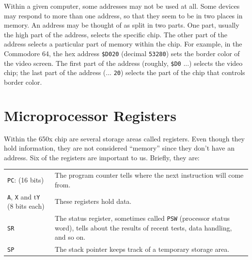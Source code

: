 \documentclass[11pt,a4paper,titlepage]{memoir}
\begin{document}
Within a given computer, some addresses may not be used at all. Some
devices may respond to more than one address, so that they seem to be
in two places in memory.
An address may be thought of as split in two parts. One part, usually the
high part of the address, selects the specific chip. The other part of the
address selects a particular part of memory within the chip. For example,
in the Commodore 64, the hex address \texttt{\$D020} (decimal \texttt{53280}) sets
the border color of the video screen. The first part of the address (roughly,
\texttt{\$D0} ...) selects the video chip; the last part of the address (... \texttt{20})
selects the part of the chip that controls border color.

\section{Microprocessor Registers}
Within the 650x chip are several storage areas called registers. Even
though they hold information, they are not considered ``memory'' since
they don't have an address. Six of the registers are important to us. Briefly,
they are:\\

\begin{tabulary}{1.0\textwidth}{lL}
	\texttt{PC}: (16 bits) & The program counter tells where the next
	instruction will come from.\\
	\texttt{A}, \texttt{X} and t\texttt{Y} (8 bits each) &  These registers hold data.\\
	\texttt{SR} & The status register, sometimes called \texttt{PSW} (processor status word), tells about the results of recent tests, data handling, and so on.\\
	\texttt{SP} &  The stack pointer keeps track of a temporary
	storage area.\\
\end{tabulary}\\
\end{document}
